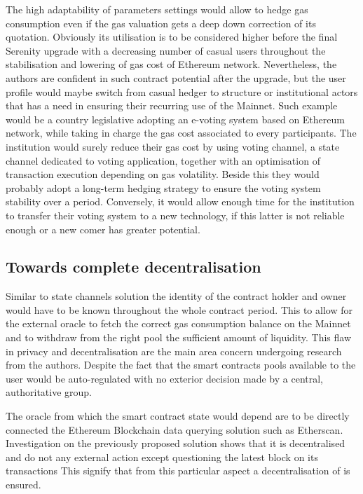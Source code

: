     The high adaptability of {\projectName} parameters settings would allow to hedge gas consumption even if the gas valuation gets a deep down correction of its quotation. Obviously its utilisation is to be considered higher before the final Serenity upgrade with a decreasing number of casual users throughout the stabilisation and lowering of gas cost of Ethereum network. Nevertheless, the authors are confident in such contract potential after the upgrade, but the user profile would maybe switch from casual hedger to structure or institutional actors that has a need in ensuring their recurring use of the Mainnet. Such example would be a country legislative adopting an e-voting system based on Ethereum network, while taking in charge the gas cost associated to every participants. The institution would surely reduce their gas cost by using voting channel, a state channel dedicated to voting application, together with an optimisation of transaction execution depending on gas volatility. Beside this they would probably adopt a long-term hedging strategy to ensure the voting system stability over a period. Conversely, it would allow enough time for the institution to transfer their voting system to a new technology, if this latter is not reliable enough or a new comer has greater potential.
     
 \subsection{Towards complete decentralisation}
    
    Similar to state channels solution the identity of the contract holder and owner would have to be known throughout the whole contract period. This to allow for the external oracle to fetch the correct gas consumption balance on the Mainnet and to withdraw from the right pool the sufficient amount of liquidity. This flaw in privacy and decentralisation are the main area concern undergoing research from the authors. Despite the fact that the smart contracts pools available to the user would be auto-regulated with no exterior decision made by a central, authoritative group.
    
    The oracle from which the smart contract state would depend are to be directly connected the Ethereum Blockchain data querying solution such as Etherscan. Investigation on the previously proposed solution shows that it is decentralised and do not any external action except questioning the latest block on its transactions \cite{XXX} This signify that from this particular aspect a decentralisation of {\projectName} is ensured.
    
    
